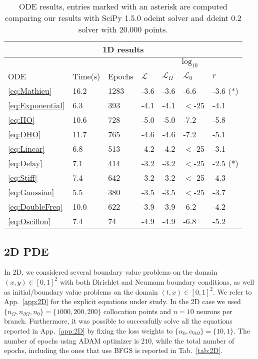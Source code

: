 \documentclass{article}
\newcommand{\mc}{\mathcal}
\begin{document}
\begin{table}
\begin{center}
\renewcommand{\arraystretch}{1.5}
\begin{tabular}{ |p{1cm}|p{1.3cm}|p{1.3cm}|p{1.0cm}|p{1.0cm}|p{1.0cm}|p{1.0cm}|  }
\hline
\multicolumn{7}{|c|}{1D results} \\
\hline
\multicolumn{3}{|c|}{}&\multicolumn{4}{|c|}{$\log_{10}$}\\
\hline
ODE    & Time(s)& Epochs &  $\mc{L}$ &$\mc{L}_{\Omega}$ &$\mc{L}_0$  & $r$ \\
\hline
\ref{eq:Mathieu}      &  16.2   & 1283  & -3.6  & -3.6  & -6.6    & -3.6   (*)   \\
\hline
\ref{eq:Exponential}  &  6.3    & 393   & -4.1  & -4.1  & $<$-25  & -4.1   \\
\hline
\ref{eq:HO}           &  10.6   & 728   & -5.0  & -5.0  & -7.2    & -5.8  \\
\hline
\ref{eq:DHO}          &  11.7   & 765   & -4.6  & -4.6  & -7.2     & -5.1  \\
\hline 
\ref{eq:Linear}       &  6.8    & 513   & -4.2  & -4.2  & $<$-25  & -3.1  \\
\hline
\ref{eq:Delay}        &  7.1    & 414   & -3.2  & -3.2  & $<$-25  &  -2.5   (*) \\
\hline
\ref{eq:Stiff}        &  7.4    & 642   & -3.2  & -3.2  & $<$-25  & -4.3 \\
\hline
\ref{eq:Gaussian}     &  5.5   &  380   & -3.5  & -3.5  & $<$-25  & -3.7  \\
\hline
\ref{eq:DoubleFreq}   &  10.0  &  622   & -3.9  & -3.9  & -6.2    & -4.2  \\
\hline
\ref{eq:Oscillon}     &  7.4   &  74    & -4.9  & -4.9  & -6.8    & -5.2  \\
\hline 
\end{tabular}
\caption{ODE results, entries marked with an asterisk are computed comparing our results with SciPy 1.5.0 \textsf{odeint} solver and \textsf{ddeint} 0.2 solver with $20.000$ points. \label{tab:1D}}
\end{center}
\end{table}


\subsection{2D PDE}
\label{sec:2DPDEs}

In 2D, we considered several boundary value problems on the domain $(x,y) \in [0,1]^2$ with both Dirichlet and Neumann boundary conditions, as well as initial/boundary value problems on the domain $(t, x) \in [0, 1]^2$. We refer to App.~\ref{app:2D} for the explicit equations under study. In the 2D case we used $\{ n_{\Omega}, n_{\partial\Omega}, n_{0}\}=\{1000, 200, 200\}$ collocation points and $n = 10$ neurons per branch. Furthermore, it was possible to successfully solve all the equations reported in App.~\ref{app:2D} by fixing the loss weights to $\{\alpha_0,\alpha_{\partial \Omega}\}=\{10,1\}$. The number of epochs using ADAM optimizer is $210$, while the total number of epochs, including the ones that use BFGS is reported in Tab.~\ref{tab:2D}.
\end{document}
